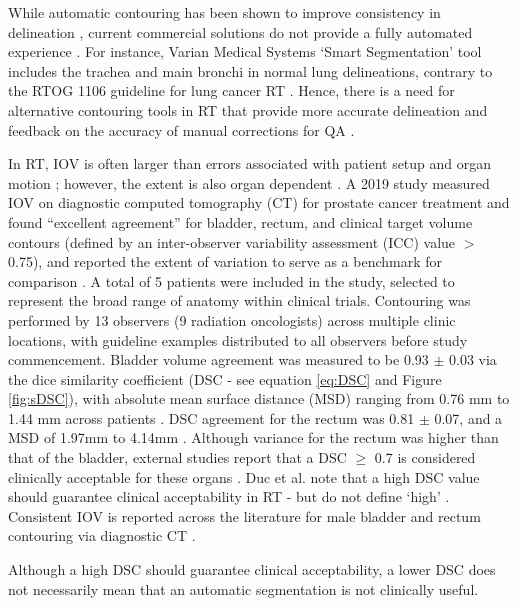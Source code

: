 While automatic contouring has been shown to improve consistency in delineation \cite{Vinod_2016}, current commercial solutions do not provide a fully automated experience \cite{Nemoto_2020}. For instance, Varian Medical Systems `Smart Segmentation' tool includes the trachea and main bronchi in normal lung delineations, contrary to the RTOG 1106 guideline for lung cancer RT \cite{Nemoto_2020}. Hence, there is a need for alternative contouring tools in RT that provide more accurate delineation \cite{Nemoto_2020} and feedback on the accuracy of manual corrections for QA \cite{Nikolov_2018}.

In RT, IOV is often larger than errors associated with patient setup and organ motion \cite{Vinod_2016, Murakami2013}; however, the extent is also organ dependent \cite{Roach_2019}. A 2019 study measured IOV on diagnostic computed tomography (CT) for prostate cancer treatment and found ``excellent agreement'' for bladder, rectum, and clinical target volume contours (defined by an inter-observer variability assessment (ICC) value $>$ 0.75), and reported the extent of variation to serve as a benchmark for comparison \cite{Roach_2019}.  A total of 5 patients were included in the study, selected to represent the broad range of anatomy within clinical trials. Contouring was performed by 13  observers (9 radiation oncologists) across multiple clinic locations, with guideline examples distributed to all observers before study commencement. Bladder volume agreement was measured to be 0.93 $\pm$ 0.03 via the dice similarity coefficient (DSC \cite{Dice1945} - see equation \ref{eq:DSC} and Figure \ref{fig:sDSC}), with absolute mean surface distance (MSD) ranging from 0.76 mm to 1.44 mm across patients \cite{Roach_2019}. DSC agreement for the rectum was  0.81 $\pm$ 0.07, and a MSD of 1.97mm to 4.14mm \cite{Roach_2019}. Although variance for the rectum was higher than that of the bladder, external studies report that a DSC $\geq$ 0.7 is considered clinically acceptable for these organs \cite{Roach_2019, Sharp2014}. Duc et al. note that a high DSC value should guarantee clinical acceptability in RT - but do not define `high' \cite{Duc}. Consistent IOV is reported across the literature for male bladder and rectum contouring via diagnostic CT \cite{Riegal2016}.

Although a high DSC should guarantee clinical acceptability, a lower DSC does not necessarily mean that an automatic segmentation is not clinically useful.

